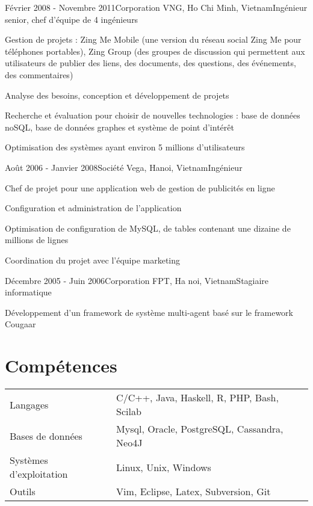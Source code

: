 \documentclass[a4paper,11pt]{article}
\begin{document}
\begin{itemCompany} {Février 2008 - Novembre 2011}{Corporation VNG, Ho Chi Minh, Vietnam}{Ingénieur senior, chef d'équipe de 4 ingénieurs} %
\item Gestion de projets : Zing Me Mobile (une version du réseau social Zing Me pour 
téléphones portables), Zing Group (des groupes de discussion qui permettent aux 
utilisateurs de publier des liens, des documents, des questions, des événements, des 
commentaires)
\item Analyse des besoins, conception et développement de projets
\item Recherche et évaluation pour choisir de nouvelles technologies : base de données 
noSQL, base de données graphes et système de point d'intérêt
\item Optimisation des systèmes ayant environ 5 millions d'utilisateurs
\end{itemCompany}

\begin{itemCompany} {Août 2006 - Janvier 2008}{Société Vega, Hanoi, Vietnam}{Ingénieur} %
\item Chef de projet pour une application web de gestion de publicités en ligne
\item Configuration et administration de l'application
\item Optimisation de configuration de MySQL, de tables contenant une dizaine de millions 
de lignes
\item Coordination du projet avec l'équipe marketing
\end{itemCompany}

\begin{itemCompany}{Décembre 2005 - Juin 2006}{Corporation FPT, Ha noi, Vietnam}{Stagiaire informatique}
\item Développement d'un framework de système multi-agent basé sur le framework Cougaar
\end{itemCompany}

\section{Compétences}
\begin{tabular}{p{5cm}l}
	Langages & C/C++, Java, Haskell, R, PHP, Bash, Scilab\\
	Bases de données & Mysql, Oracle, PostgreSQL, Cassandra, Neo4J\\
	Systèmes d'exploitation & Linux, Unix, Windows\\
	Outils & Vim, Eclipse, Latex, Subversion, Git
\end{tabular}
\end{document}
